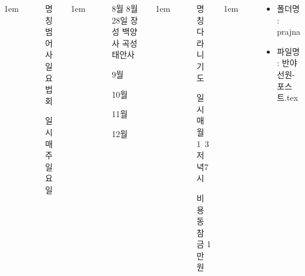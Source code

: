 \documentclass[	20pt, 
							a1paper, 
							portrait, %
							margin=0mm, %
							innermargin=10mm,  		%
							colspace=5mm, 
							subcolspace=0mm
							]{tikzposter}
\begin{document}
\begin{columns}


			{
					\setlength{\leftmargini}{4em}
					\setlength{\labelsep} {1em}
				\begin{LARGE}
					\begin{itemize}
					\item [명칭] 범어사 일요법회
					\item [일시] 매주 일요일
					\end{itemize}
				\end{LARGE}
			}


			{
					\setlength{\leftmargini}{5em}
					\setlength{\labelsep} {1em}
				\begin{LARGE}
					\begin{itemize}
					\item [8월] 8월 28일 장성 백양사 곡성 태안사
					\item [9월] 
					\item [10월] 
					\item [11월] 
					\item [12월] 

					\end{itemize}
				\end{LARGE}
			}


			{
					\setlength{\leftmargini}{4em}
					\setlength{\labelsep} {1em}
				\begin{LARGE}
					\begin{itemize}
					\item [명칭] 다라니기도
					\item [일시] 매월 1~3 저녁7시
					\item [비용] 동참금 1만원
					\end{itemize}
				\end{LARGE}
			}


			{
					\setlength{\leftmargini}{4em}
					\setlength{\labelsep} {1em}
				\begin{LARGE}
				\end{LARGE}
			} %


			{
				\begin{LARGE}
					\begin{itemize}
					\item 폴더명 : prajna
					\item 파일명 : 반야선원-포스트.tex
					\end{itemize}
				\end{LARGE}
			}


	\end{columns}
\end{document}
